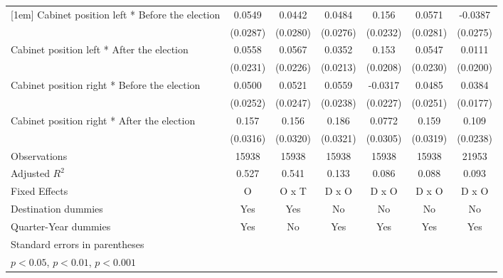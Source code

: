 \begin{table}[htbp]
\begin{tabular}{l*{6}{c}}
[1em]
Cabinet position left * Before the election&      0.0549         &      0.0442         &      0.0484         &       0.156\sym{***}&      0.0571\sym{*}  &     -0.0387         \\
                    &    (0.0287)         &    (0.0280)         &    (0.0276)         &    (0.0232)         &    (0.0281)         &    (0.0275)         \\
[1em]
Cabinet position left * After the election&      0.0558\sym{*}  &      0.0567\sym{*}  &      0.0352         &       0.153\sym{***}&      0.0547\sym{*}  &      0.0111         \\
                    &    (0.0231)         &    (0.0226)         &    (0.0213)         &    (0.0208)         &    (0.0230)         &    (0.0200)         \\
[1em]
Cabinet position right * Before the election&      0.0500         &      0.0521\sym{*}  &      0.0559\sym{*}  &     -0.0317         &      0.0485         &      0.0384\sym{*}  \\
                    &    (0.0252)         &    (0.0247)         &    (0.0238)         &    (0.0227)         &    (0.0251)         &    (0.0177)         \\
[1em]
Cabinet position right * After the election&       0.157\sym{***}&       0.156\sym{***}&       0.186\sym{***}&      0.0772\sym{*}  &       0.159\sym{***}&       0.109\sym{***}\\
                    &    (0.0316)         &    (0.0320)         &    (0.0321)         &    (0.0305)         &    (0.0319)         &    (0.0238)         \\
\hline
Observations        &       15938         &       15938         &       15938         &       15938         &       15938         &       21953         \\
Adjusted \(R^{2}\)  &       0.527         &       0.541         &       0.133         &       0.086         &       0.088         &       0.093         \\
Fixed Effects       &           O         &       O x T         &       D x O         &       D x O         &       D x O         &       D x O         \\
Destination dummies &         Yes         &         Yes         &          No         &          No         &          No         &          No         \\
Quarter-Year dummies&         Yes         &          No         &         Yes         &         Yes         &         Yes         &         Yes         \\
\hline\hline
\multicolumn{7}{l}{\footnotesize Standard errors in parentheses}\\
\multicolumn{7}{l}{\footnotesize \sym{*} \(p<0.05\), \sym{**} \(p<0.01\), \sym{***} \(p<0.001\)}\\
\end{tabular}
\end{table}
